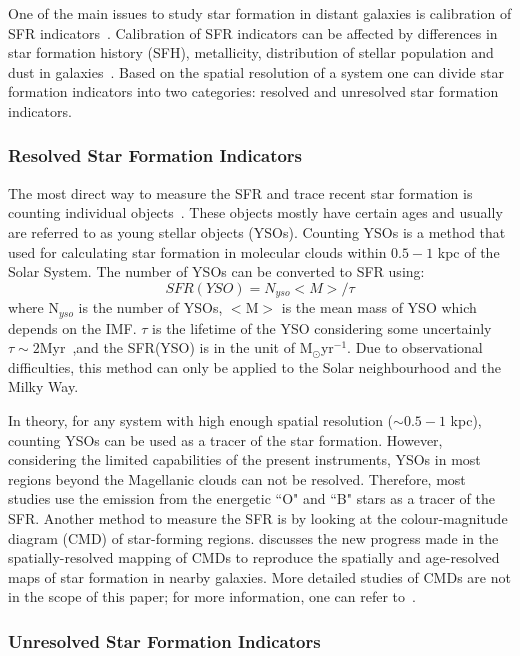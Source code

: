 One of the main issues to study star formation in distant galaxies is calibration of SFR indicators~\citep[e.g.,][]{Lee10}. 
Calibration of SFR indicators can be affected by differences in star formation history (SFH), metallicity, distribution of stellar population and dust in galaxies~\citep{Calzetti13}. 
Based on the spatial resolution of a system one can divide star formation indicators into two categories: resolved and unresolved star formation indicators.

\subsubsection{Resolved Star Formation Indicators}
The most direct way to measure the SFR and trace recent star formation is counting individual objects~\citep{Kennicutt12}. 
These objects mostly have certain ages and usually are referred to as young stellar objects (YSOs). 
Counting YSOs is a method that used for calculating star formation in molecular clouds within $0.5- 1$ kpc of the Solar System. 
The number of YSOs can be converted to SFR using: 
\begin{equation}
SFR(YSO) = N_{yso} <M>/\tau 
\end{equation}
where N$_{yso}$ is the number of YSOs, $<$M$>$ is the mean mass of YSO which depends on the IMF. 
$\tau$ is the lifetime of the YSO considering some uncertainly $\tau \sim 2$Myr~\citep{Evans09},and the SFR(YSO) is in the unit of M$_{\odot}$yr$^{-1}$. 
Due to observational difficulties, this method can only be applied to the Solar neighbourhood and the Milky Way. 

In theory, for any system with high enough spatial resolution ($\sim 0.5- 1$ kpc), counting YSOs can be used as a tracer of the star formation. 
However, considering the limited capabilities of the present instruments, YSOs in most regions beyond the Magellanic clouds can not be resolved. 
Therefore, most studies use the emission from the energetic ``O" and ``B" stars as a tracer of the SFR. 
Another method to measure the SFR is by looking at the colour-magnitude diagram (CMD) of star-forming regions. 
\cite{Kennicutt12} discusses the new progress made in the spatially-resolved mapping of CMDs to reproduce the spatially and age-resolved maps of star formation in nearby galaxies. 
More detailed studies of CMDs are not in the scope of this paper; for more information, one can refer to~\citep{Kennicutt12}. 

\subsubsection{Unresolved Star Formation Indicators}


